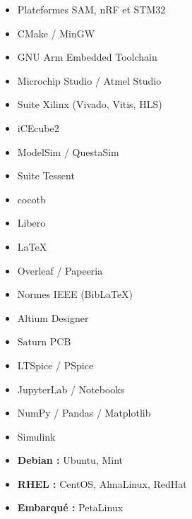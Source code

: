 
\cvskillheader

{\vspace{-12pt}
\begin{itemize}
    \item Plateformes SAM, nRF et STM32
    \item CMake / MinGW
    \item GNU Arm Embedded Toolchain
    \item Microchip Studio / Atmel Studio
\end{itemize}}

{\vspace{-12pt}
\begin{itemize}
    \item Suite Xilinx (Vivado, Vitis, HLS)
    \item iCEcube2
    \item ModelSim / QuestaSim
    \item Suite Tessent
    \item cocotb
    \item Libero
\end{itemize}}

{\vspace{-12pt}
\begin{itemize}
    \item \LaTeX
    \item Overleaf / Papeeria
    \item Normes IEEE (BibLaTeX)
\end{itemize}}

{\vspace{-12pt}
\begin{itemize}
    \item Altium Designer
    \item Saturn PCB
    \item LTSpice / PSpice
\end{itemize}}

{\vspace{-12pt}
\begin{itemize}
    \item JupyterLab / Notebooks
    \item NumPy / Pandas / Matplotlib
    \item Simulink
\end{itemize}}

{\vspace{-12pt}
\begin{itemize}
    \item \textbf{Debian : }Ubuntu, Mint
    \item \textbf{RHEL : }CentOS, AlmaLinux, RedHat
    \item \textbf{Embarqué : }PetaLinux
\end{itemize}}
